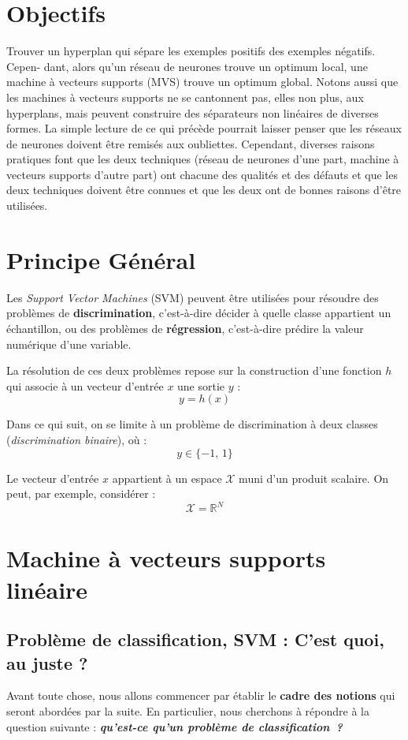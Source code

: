 \section{Objectifs}
Trouver un hyperplan qui sépare les exemples positifs des exemples négatifs. Cepen-
dant, alors qu’un réseau de neurones trouve un optimum local, une machine à vecteurs
supports (MVS) trouve un optimum global. Notons aussi que les machines à vecteurs
supports ne se cantonnent pas, elles non plus, aux hyperplans, mais peuvent construire
des séparateurs non linéaires de diverses formes.
La simple lecture de ce qui précède pourrait laisser penser que les réseaux de neurones
doivent être remisés aux oubliettes. Cependant, diverses raisons pratiques font que les
deux techniques (réseau de neurones d’une part, machine à vecteurs supports d’autre
part) ont chacune des qualités et des défauts et que les deux techniques doivent être
connues et que les deux ont de bonnes raisons d’être utilisées.
\section{Principe Général}
Les \textit{Support Vector Machines} (SVM) peuvent être utilisées pour résoudre des
problèmes de \textbf{discrimination}, c’est-à-dire décider à quelle classe appartient un
échantillon, ou des problèmes de \textbf{régression}, c’est-à-dire prédire la valeur
numérique d’une variable.

La résolution de ces deux problèmes repose sur la construction d’une fonction
\( h \) qui associe à un vecteur d’entrée \( x \) une sortie \( y \) :
\[
y = h(x)
\]

Dans ce qui suit, on se limite à un problème de discrimination à deux classes
(\textit{discrimination binaire}), où :
\[
y \in \{-1,\,1\}
\]

Le vecteur d’entrée \( x \) appartient à un espace \( \mathcal{X} \) muni d’un produit
scalaire. On peut, par exemple, considérer :
\[
\mathcal{X} = \mathbb{R}^N
\]

\section{Machine à vecteurs supports linéaire}
\subsection{Problème de classification, SVM : C’est quoi, au
juste ?}
Avant toute chose, nous allons commencer par établir le \textbf{cadre des notions}
qui seront abordées par la suite. En particulier, nous cherchons à répondre à la
question suivante : \emph{\textbf{qu’est-ce qu’un problème de classification~?}}

